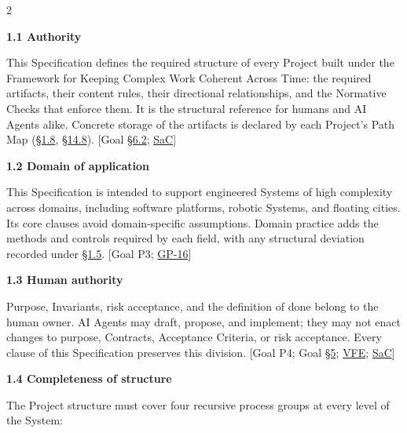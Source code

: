 \begin{multicols}{2}
\hypertarget{nss-1.1}{}

\par\smallskip\noindent\textbf{1.1 Authority}\par\nopagebreak

This Specification defines the required structure of every Project built under the Framework for Keeping Complex Work Coherent Across Time: the required artifacts, their content rules, their directional relationships, and the Normative Checks that enforce them. It is the structural reference for humans and AI Agents alike. Concrete storage of the artifacts is declared by each Project's Path Map (\hyperlink{nss-1.8}{\S1.8}, \hyperlink{nss-14.8}{\S14.8}). [Goal \hyperlink{nss-6.2}{\S6.2}; \hyperlink{gp-SaC}{SaC}]

\hypertarget{nss-1.2}{}

\par\smallskip\noindent\textbf{1.2 Domain of application}\par\nopagebreak

This Specification is intended to support engineered Systems of high complexity across domains, including software platforms, robotic Systems, and floating cities. Its core clauses avoid domain-specific assumptions. Domain practice adds the methods and controls required by each field, with any structural deviation recorded under \hyperlink{nss-1.5}{\S1.5}. [Goal P3; \hyperlink{gp-16}{GP-16}]

\hypertarget{nss-1.3}{}

\par\smallskip\noindent\textbf{1.3 Human authority}\par\nopagebreak

Purpose, Invariants, risk acceptance, and the definition of done belong to the human owner. AI Agents may draft, propose, and implement; they may not enact changes to purpose, Contracts, Acceptance Criteria, or risk acceptance. Every clause of this Specification preserves this division. [Goal P4; Goal \hyperlink{nss-5}{\S5}; \hyperlink{gp-VFE}{VFE}; \hyperlink{gp-SaC}{SaC}]

\hypertarget{nss-1.4}{}

\par\smallskip\noindent\textbf{1.4 Completeness of structure}\par\nopagebreak

The Project structure must cover four recursive process groups at every level of the System:

\begin{enumerate}\setlength{\itemsep}{0pt}\setlength{\parskip}{0pt}


\end{enumerate}
\end{multicols}
